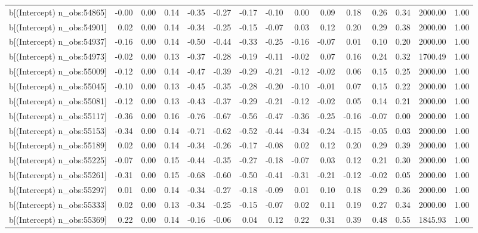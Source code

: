 \begin{table}[ht]
\begin{tabular}{rrrrrrrrrrrrrrr}
  b[(Intercept) n\_obs:54865] & -0.00 & 0.00 & 0.14 & -0.35 & -0.27 & -0.17 & -0.10 & 0.00 & 0.09 & 0.18 & 0.26 & 0.34 & 2000.00 & 1.00 \\ 
  b[(Intercept) n\_obs:54901] & 0.02 & 0.00 & 0.14 & -0.34 & -0.25 & -0.15 & -0.07 & 0.03 & 0.12 & 0.20 & 0.29 & 0.38 & 2000.00 & 1.00 \\ 
  b[(Intercept) n\_obs:54937] & -0.16 & 0.00 & 0.14 & -0.50 & -0.44 & -0.33 & -0.25 & -0.16 & -0.07 & 0.01 & 0.10 & 0.20 & 2000.00 & 1.00 \\ 
  b[(Intercept) n\_obs:54973] & -0.02 & 0.00 & 0.13 & -0.37 & -0.28 & -0.19 & -0.11 & -0.02 & 0.07 & 0.16 & 0.24 & 0.32 & 1700.49 & 1.00 \\ 
  b[(Intercept) n\_obs:55009] & -0.12 & 0.00 & 0.14 & -0.47 & -0.39 & -0.29 & -0.21 & -0.12 & -0.02 & 0.06 & 0.15 & 0.25 & 2000.00 & 1.00 \\ 
  b[(Intercept) n\_obs:55045] & -0.10 & 0.00 & 0.13 & -0.45 & -0.35 & -0.28 & -0.20 & -0.10 & -0.01 & 0.07 & 0.15 & 0.22 & 2000.00 & 1.00 \\ 
  b[(Intercept) n\_obs:55081] & -0.12 & 0.00 & 0.13 & -0.43 & -0.37 & -0.29 & -0.21 & -0.12 & -0.02 & 0.05 & 0.14 & 0.21 & 2000.00 & 1.00 \\ 
  b[(Intercept) n\_obs:55117] & -0.36 & 0.00 & 0.16 & -0.76 & -0.67 & -0.56 & -0.47 & -0.36 & -0.25 & -0.16 & -0.07 & 0.00 & 2000.00 & 1.00 \\ 
  b[(Intercept) n\_obs:55153] & -0.34 & 0.00 & 0.14 & -0.71 & -0.62 & -0.52 & -0.44 & -0.34 & -0.24 & -0.15 & -0.05 & 0.03 & 2000.00 & 1.00 \\ 
  b[(Intercept) n\_obs:55189] & 0.02 & 0.00 & 0.14 & -0.34 & -0.26 & -0.17 & -0.08 & 0.02 & 0.12 & 0.20 & 0.29 & 0.39 & 2000.00 & 1.00 \\ 
  b[(Intercept) n\_obs:55225] & -0.07 & 0.00 & 0.15 & -0.44 & -0.35 & -0.27 & -0.18 & -0.07 & 0.03 & 0.12 & 0.21 & 0.30 & 2000.00 & 1.00 \\ 
  b[(Intercept) n\_obs:55261] & -0.31 & 0.00 & 0.15 & -0.68 & -0.60 & -0.50 & -0.41 & -0.31 & -0.21 & -0.12 & -0.02 & 0.05 & 2000.00 & 1.00 \\ 
  b[(Intercept) n\_obs:55297] & 0.01 & 0.00 & 0.14 & -0.34 & -0.27 & -0.18 & -0.09 & 0.01 & 0.10 & 0.18 & 0.29 & 0.36 & 2000.00 & 1.00 \\ 
  b[(Intercept) n\_obs:55333] & 0.02 & 0.00 & 0.13 & -0.34 & -0.25 & -0.15 & -0.07 & 0.02 & 0.11 & 0.19 & 0.27 & 0.34 & 2000.00 & 1.00 \\ 
  b[(Intercept) n\_obs:55369] & 0.22 & 0.00 & 0.14 & -0.16 & -0.06 & 0.04 & 0.12 & 0.22 & 0.31 & 0.39 & 0.48 & 0.55 & 1845.93 & 1.00 \\ 

\end{tabular}
\end{table}
